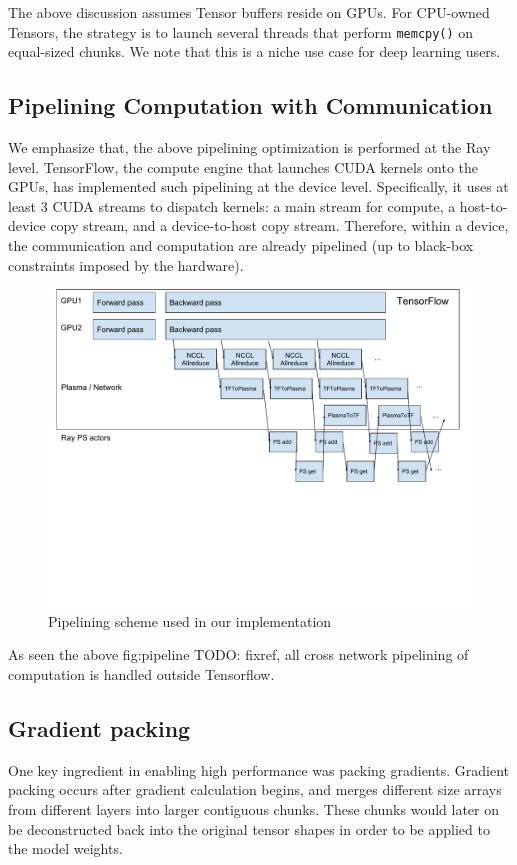 The above discussion assumes Tensor buffers reside on GPUs.  For CPU-owned Tensors, the strategy is to launch several threads that perform \texttt{memcpy()} on equal-sized chunks.  We note that this is a niche use case for deep learning users.

\subsection{Pipelining Computation with Communication}

We emphasize that, the above pipelining optimization is performed at the Ray level.  TensorFlow, the compute engine that launches CUDA kernels onto the GPUs, has implemented such pipelining at the device level.  Specifically, it uses at least 3 CUDA streams to dispatch kernels: a main stream for compute, a host-to-device copy stream, and a device-to-host copy stream.  Therefore, within a device, the communication and computation are already pipelined (up to black-box constraints imposed by the hardware).

\begin{figure}
    \centering
    \includegraphics[width=5.1in,keepaspectratio]{fig/pipeline.pdf}
    \caption{
    \small{
        Pipelining scheme used in our implementation
    }
    }
    \label{fig:pipeline}
\end{figure}
As seen the above fig:pipeline {\color{red} TODO: {fixref}}, all cross network pipelining of computation is handled outside Tensorflow.



\subsection{Gradient packing}
One key ingredient in enabling high performance was packing gradients. Gradient packing occurs after gradient calculation begins, and merges different size arrays from different layers into larger contiguous chunks. These chunks would later on be deconstructed back into the original tensor shapes in order to be applied to the model weights.

